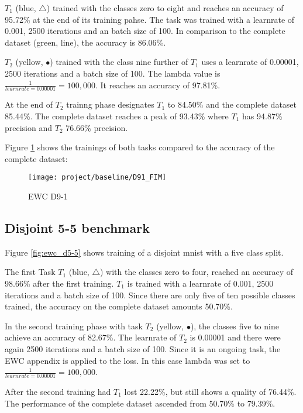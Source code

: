 $T_1$ (blue, $\bigtriangleup$) trained with the classes zero to eight and reaches an accuracy of 95.72\% at the end of its training pahse.
The task was trained with a learnrate of 0.001, 2500 iterations and an batch size of 100.
In comparison to the complete dataset (green, line), the accuracy is 86.06\%.

$T_2$ (yellow, $\bullet$) trained with the class nine further of $T_1$ uses a learnrate of 0.00001, 2500 iterations and a batch size of 100.
The lambda value is $\frac{1}{learnrate = 0.00001} = 100,000$.
It reaches an accuracy of 97.81\%.

At the end of $T_2$ trainng phase designates $T_1$ to 84.50\% and the complete dataset 85.44\%.
The complete dataset reaches a peak of 93.43\% where $T_1$ has 94.87\% precision and $T_2$ 76.66\% precision.

Figure \ref{fig:ewc_d9-1} shows the trainings of both tasks compared to the accuracy of the complete dataset:

\begin{figure}[H]
    \centering
    \texttt{[image: project/baseline/D91\_FIM]}
    \caption{EWC D9-1}
    \label{fig:ewc_d9-1}
\end{figure}

\subsection{Disjoint 5-5 benchmark}

Figure \ref{fig:ewc_d5-5} shows training of a disjoint mnist with a five class split.

The first Task $T_1$ (blue, $\bigtriangleup$) with the classes zero to four, reached an accuracy of 98.66\% after the first training.
$T_1$ is trained with a learnrate of 0.001, 2500 iterations and a batch size of 100.
Since there are only five of ten possible classes trained, the accuracy on the complete dataset amounts 50.70\%.

In the second training phase with task $T_2$ (yellow, $\bullet$), the classes five to nine achieve an accuracy of 82.67\%.
The learnrate of $T_2$ is 0.00001 and there were again 2500 iterations and a batch size of 100.
Since it is an ongoing task, the EWC appendix is applied to the loss.
In this case lambda was set to $\frac{1}{learnrate = 0.00001} = 100,000$.

After the second training had $T_1$ lost 22.22\%, but still shows a quality of 76.44\%.
The performance of the complete dataset ascended from 50.70\% to 79.39\%.

